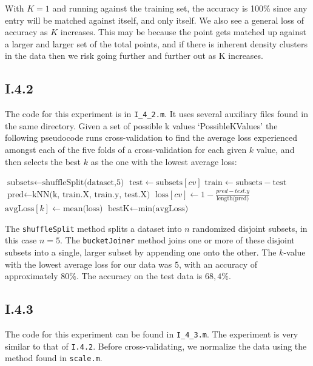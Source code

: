 With $K=1$ and running against the training set, the accuracy is 100\% since any
entry will be matched against itself, and only itself. We also see a general
loss of accuracy as $K$ increases. This may be because the point gets matched up
against a larger and larger set of the total points, and if there is inherent density
clusters in the data then we risk going further and further out as K increases.

\subsection{I.4.2}
The code for this experiment is in \texttt{I\_4\_2.m}. It uses several auxiliary
files found in the same directory. Given a set of possible k values `PossibleKValues'
the following pseudocode runs cross-validation to find the average loss experienced amongst
each of the five folds of a cross-validation for each given $k$ value, and then selects the
best $k$ as the one with the lowest average loss:

\begin{algorithmic}
		\State $\text{subsets} \gets \text{shuffleSplit(dataset,5)}$
			\State $\text{test} \gets \text{subsets}[cv]$ 
			\State $\text{train} \gets \text{subsets} - \text{test}$ 
			\State $\text{pred} \gets \text{kNN(k, train.X, train.y, test.X)}$
			\State $\text{loss}[cv] \gets 1 - \frac{pred - test.y}{\text{length(pred)}}$
		\EndFor
		\State $\text{avgLoss}[k] \gets \text{mean(loss)}$
	\EndFor
	\State $\text{bestK} \gets \text{min(avgLoss)}$ 
\end{algorithmic}

The \texttt{shuffleSplit} method splits a dataset into $n$ randomized disjoint
subsets, in this case $n = 5$. The \texttt{bucketJoiner} method joins one or
more of these disjoint subsets into a single, larger subset by appending one
onto the other. The $k$-value with the lowest average loss for our data was
$5$, with an accuracy of approximately $80\%$. The accuracy on the test data is
$68,4\%$.

\subsection{I.4.3}
The code for this experiment can be found in \texttt{I\_4\_3.m}. The experiment
is very similar to that of \texttt{I.4.2}. Before cross-validating, we normalize
the data using the method found in \texttt{scale.m}.

